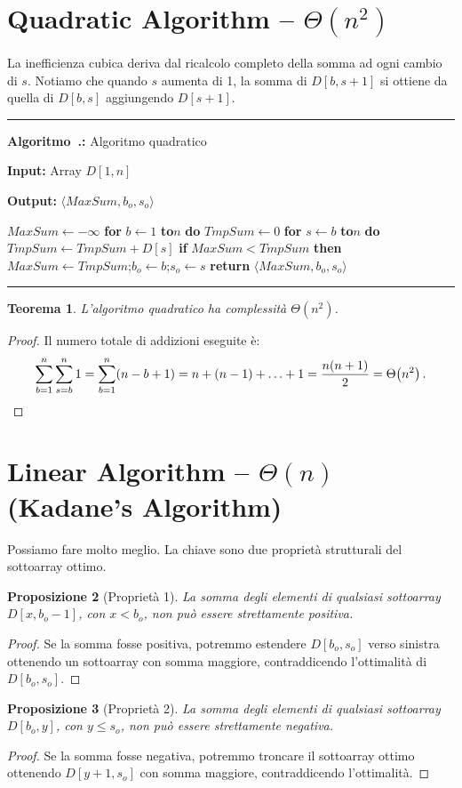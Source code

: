 \documentclass[12pt, a4paper, oneside]{book}
\newcounter{algocf}[chapter]
\renewcommand{\thealgocf}{\thechapter.\arabic{algocf}}
\newenvironment{algorithm}[1][H]{%
  \refstepcounter{algocf}%
  \par\medskip\noindent\rule{\linewidth}{0.4pt}\par\smallskip
}{%
  \par\smallskip\noindent\rule{\linewidth}{0.4pt}\par\medskip
}
\newcommand{\algcaption}[1]{\noindent\textbf{Algoritmo~\thealgocf:} #1\par\smallskip}
\newcommand{\KwIn}[1]{\noindent\textbf{Input:} #1\par}
\newcommand{\KwOut}[1]{\noindent\textbf{Output:} #1\par}
\newcommand{\For}[1]{\noindent\textbf{for} #1 \textbf{do}}
\newcommand{\If}[1]{\noindent\textbf{if} #1 \textbf{then}}
\newcommand{\Return}[1]{\noindent\textbf{return} #1}
\newcommand{\KwTo}{\textbf{to}}
\theoremstyle{plain}
\newtheorem{teorema}{Teorema}[chapter]
\newtheorem{proposizione}[teorema]{Proposizione}
\theoremstyle{definition}
\theoremstyle{remark}
\newcommand{\Th}[1]{\Theta\!\left(#1\right)}
\begin{document}
\section{Quadratic Algorithm -- $\Th{n^2}$}

La inefficienza cubica deriva dal ricalcolo completo della somma ad ogni cambio di $s$. Notiamo che quando $s$ aumenta di 1, la somma di $D[b,s+1]$ si ottiene da quella di $D[b,s]$ aggiungendo $D[s+1]$.

\begin{algorithm}[H]
\algcaption{Algoritmo quadratico}
\KwIn{Array $D[1,n]$}
\KwOut{$\langle MaxSum, b_o, s_o \rangle$}
$MaxSum \leftarrow -\infty$\;
\For{$b \leftarrow 1$ \KwTo $n$}{
  $TmpSum \leftarrow 0$\;
  \For{$s \leftarrow b$ \KwTo $n$}{
    $TmpSum \leftarrow TmpSum + D[s]$\;
    \If{$MaxSum < TmpSum$}{
      $MaxSum \leftarrow TmpSum$;\quad $b_o \leftarrow b$;\quad $s_o \leftarrow s$\;
    }
  }
}
\Return{$\langle MaxSum, b_o, s_o \rangle$}\;
\end{algorithm}

\begin{teorema}
L'algoritmo quadratico ha complessità $\Th{n^2}$.
\end{teorema}
\begin{proof}
Il numero totale di addizioni eseguite è:
\[
\sum_{b=1}^{n} \sum_{s=b}^{n} 1 = \sum_{b=1}^{n} (n - b + 1) = n + (n-1) + \ldots + 1 = \frac{n(n+1)}{2} = \Th{n^2}. \qedhere
\]
\end{proof}

\section{Linear Algorithm -- $\Th{n}$ (Kadane's Algorithm)}

Possiamo fare molto meglio. La chiave sono due proprietà strutturali del sottoarray ottimo.

\begin{proposizione}[Proprietà 1]
La somma degli elementi di qualsiasi sottoarray $D[x, b_o - 1]$, con $x < b_o$, non può essere strettamente positiva.
\end{proposizione}
\begin{proof}
Se la somma fosse positiva, potremmo estendere $D[b_o, s_o]$ verso sinistra ottenendo un sottoarray con somma maggiore, contraddicendo l'ottimalità di $D[b_o, s_o]$.
\end{proof}

\begin{proposizione}[Proprietà 2]
La somma degli elementi di qualsiasi sottoarray $D[b_o, y]$, con $y \le s_o$, non può essere strettamente negativa.
\end{proposizione}
\begin{proof}
Se la somma fosse negativa, potremmo troncare il sottoarray ottimo ottenendo $D[y+1, s_o]$ con somma maggiore, contraddicendo l'ottimalità.
\end{proof}
\end{document}
